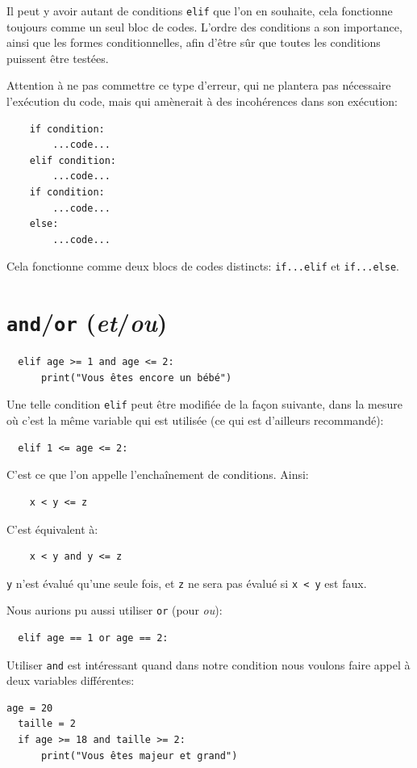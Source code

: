 \documentclass[a4paper,12pt]{book}
\begin{document}
Il peut y avoir autant de conditions \texttt{elif} que l'on en souhaite, cela fonctionne toujours comme un seul bloc de codes. L'ordre des conditions a son importance, ainsi que les formes conditionnelles, afin d'être sûr que toutes les conditions puissent être testées.
\medskip

Attention à ne pas commettre ce type d'erreur, qui ne plantera pas nécessaire l'exécution du code, mais qui amènerait à des incohérences dans son exécution:
\begin{verbatim}
    if condition:
        ...code...
    elif condition:
        ...code...
    if condition:
        ...code...
    else:
        ...code...
\end{verbatim}
\medskip

Cela fonctionne comme deux blocs de codes distincts: \texttt{if...elif} et \texttt{if...else}.
\medskip

\section{\texttt{and}/\texttt{or} (\textit{et}/\textit{ou})}
\begin{lstlisting}
  elif age >= 1 and age <= 2:
  	  print("Vous êtes encore un bébé")
\end{lstlisting}
\medskip

Une telle condition \texttt{elif} peut être modifiée de la façon suivante, dans la mesure où c'est la même variable qui est utilisée (ce qui est d'ailleurs recommandé):
\begin{lstlisting}
  elif 1 <= age <= 2:
\end{lstlisting}
\medskip

C'est ce que l'on appelle l'enchaînement de conditions. Ainsi:
\begin{verbatim}
    x < y <= z
\end{verbatim}
\medskip

C'est équivalent à:
\begin{verbatim}
    x < y and y <= z
\end{verbatim}
\medskip

\texttt{y} n'est évalué qu'une seule fois, et \texttt{z} ne sera pas évalué si \texttt{x < y} est faux.
\medskip

Nous aurions pu aussi utiliser \texttt{or} (pour \textit{ou}):
\begin{lstlisting}
  elif age == 1 or age == 2:
\end{lstlisting}
\medskip

Utiliser \texttt{and} est intéressant quand dans notre condition nous voulons faire appel à deux variables différentes:
\begin{lstlisting}[caption=\texttt{and} avec deux variables différentes]
  age = 20
  taille = 2
  if age >= 18 and taille >= 2:
  	  print("Vous êtes majeur et grand")
\end{lstlisting}
\medskip
\end{document}
